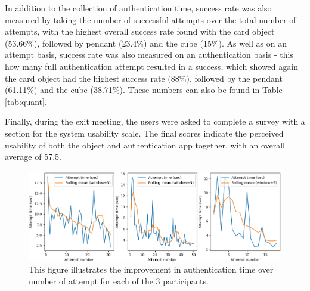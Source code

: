 \documentclass{l4proj}
\begin{document}
In addition to the collection of authentication time, success rate was also measured by taking the number of successful attempts over the total number of attempts, with the highest overall success rate found with the card object (53.66\%), followed by pendant (23.4\%) and the cube (15\%). As well as on an attempt basis, success rate was also measured on an authentication basis - this how many full authentication attempt resulted in a success, which showed again the card object had the highest success rate (88\%), followed by the pendant (61.11\%) and the cube (38.71\%). These numbers can also be found in Table \ref{tab:quant}.

Finally, during the exit meeting, the users were asked to complete a survey with a section for the system usability scale. The final scores indicate the perceived usability of both the object and authentication app together, with an overall average of 57.5.

\begin{table}[]
    \centering
    \caption{Table detailing the quantitative results for each participant and model}
    \label{tab:quant}
\end{table}

\begin{figure}
    \centering
    \includegraphics[width=\linewidth]{images/timetaken_with_rolling_mean.png}
    \caption{This figure illustrates the improvement in authentication time over number of attempt for each of the 3 participants.}
    \label{fig:time_taken}
\end{figure}
\end{document}
